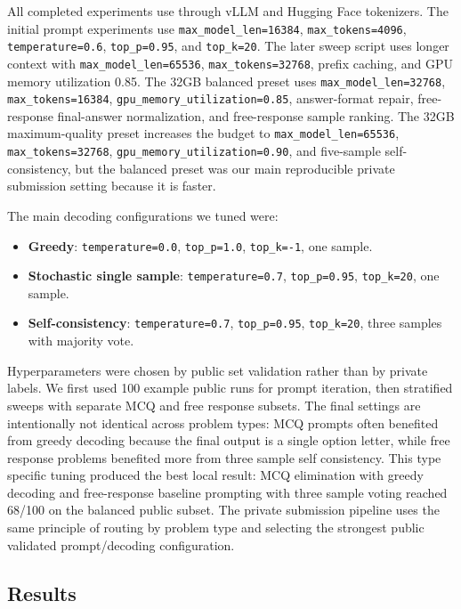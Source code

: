 \documentclass{article}
\begin{document}
All completed experiments use  through vLLM and Hugging Face tokenizers. The initial prompt experiments use \texttt{max\_model\_len=16384}, \texttt{max\_tokens=4096}, \texttt{temperature=0.6}, \texttt{top\_p=0.95}, and \texttt{top\_k=20}. The later sweep script uses longer context with \texttt{max\_model\_len=65536}, \texttt{max\_tokens=32768}, prefix caching, and GPU memory utilization 0.85. The 32GB balanced preset uses \texttt{max\_model\_len=32768}, \texttt{max\_tokens=16384}, \texttt{gpu\_memory\_utilization=0.85}, answer-format repair, free-response final-answer normalization, and free-response sample ranking. The 32GB maximum-quality preset increases the budget to \texttt{max\_model\_len=65536}, \texttt{max\_tokens=32768}, \texttt{gpu\_memory\_utilization=0.90}, and five-sample self-consistency, but the balanced preset was our main reproducible private submission setting because it is faster.

The main decoding configurations we tuned were:
\begin{itemize}
  \item \textbf{Greedy}: \texttt{temperature=0.0}, \texttt{top\_p=1.0}, \texttt{top\_k=-1}, one sample.
  \item \textbf{Stochastic single sample}: \texttt{temperature=0.7}, \texttt{top\_p=0.95}, \texttt{top\_k=20}, one sample.
  \item \textbf{Self-consistency}: \texttt{temperature=0.7}, \texttt{top\_p=0.95}, \texttt{top\_k=20}, three samples with majority vote.
\end{itemize}

Hyperparameters were chosen by public set validation rather than by private labels. We first used 100 example public runs for prompt iteration, then stratified sweeps with separate MCQ and free response subsets. The final settings are intentionally not identical across problem types: MCQ prompts often benefited from greedy decoding because the final output is a single option letter, while free response problems benefited more from three sample self consistency. This type specific tuning produced the best local result: MCQ elimination with greedy decoding and free-response baseline prompting with three sample voting reached 68/100 on the balanced public subset. The private submission pipeline uses the same principle of routing by problem type and selecting the strongest public validated prompt/decoding configuration.
% 
\subsection{Results}
\label{sec:results}
\end{document}

